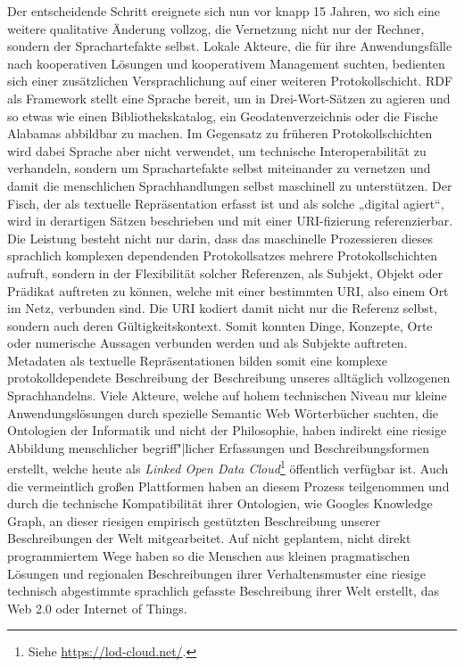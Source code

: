 \documentclass[12pt,a4paper]{article}
\begin{document}
Der entscheidende Schritt ereignete sich nun vor knapp 15 Jahren, wo sich eine
weitere qualitative Änderung vollzog, die Vernetzung nicht nur der Rechner,
sondern der Sprachartefakte selbst.  Lokale Akteure, die für ihre
Anwendungsfälle nach kooperativen Lösungen und kooperativem Management
suchten, bedienten sich einer zusätzlichen Versprachlichung auf einer weiteren
Protokollschicht. RDF als Framework stellt eine Sprache bereit, um in
Drei-Wort-Sätzen zu agieren und so etwas wie einen Bibliothekskatalog, ein
Geodatenverzeichnis oder die Fische Alabamas abbildbar zu machen.  Im
Gegensatz zu früheren Protokollschichten wird dabei Sprache aber nicht
verwendet, um technische Interoperabilität zu verhandeln, sondern um
Sprachartefakte selbst miteinander zu vernetzen und damit die menschlichen
Sprachhandlungen selbst maschinell zu unterstützen.  Der Fisch, der als
textuelle Repräsentation erfasst ist und als solche „digital agiert“, wird in
derartigen Sätzen beschrieben und mit einer URI-fizierung referenzierbar.  Die
Leistung besteht nicht nur darin, dass das maschinelle Prozessieren dieses
sprachlich komplexen dependenden Protokollsatzes mehrere Protokollschichten
aufruft, sondern in der Flexibilität solcher Referenzen, als Subjekt, Objekt
oder Prädikat auftreten zu können, welche mit einer bestimmten URI, also einem
Ort im Netz, verbunden sind. Die URI kodiert damit nicht nur die Referenz
selbst, sondern auch deren Gültigkeitskontext. Somit konnten Dinge, Konzepte,
Orte oder numerische Aussagen verbunden werden und als Subjekte auftreten.
Metadaten als textuelle Repräsentationen bilden somit eine komplexe
protokolldependete Beschreibung der Beschreibung unseres alltäglich
vollzogenen Sprachhandelns. Viele Akteure, welche auf hohem technischen Niveau
nur kleine Anwendungslösungen durch spezielle Semantic Web Wörterbücher
suchten, die Ontologien der Informatik und nicht der Philosophie, haben
indirekt eine riesige Abbildung menschlicher begriff"|licher Erfassungen und
Beschreibungsformen erstellt, welche heute als \emph{Linked Open Data
  Cloud}\footnote{Siehe \url{https://lod-cloud.net/}.}  öffentlich verfügbar
ist. Auch die vermeintlich großen Plattformen haben an diesem Prozess
teilgenommen und durch die technische Kompatibilität ihrer Ontologien, wie
Googles Knowledge Graph, an dieser riesigen empirisch gestützten Beschreibung
unserer Beschreibungen der Welt mitgearbeitet. Auf nicht geplantem, nicht
direkt programmiertem Wege haben so die Menschen aus kleinen pragmatischen
Lösungen und regionalen Beschreibungen ihrer Verhaltensmuster eine riesige
technisch abgestimmte sprachlich gefasste Beschreibung ihrer Welt erstellt,
das Web 2.0 oder Internet of Things.
\end{document}
